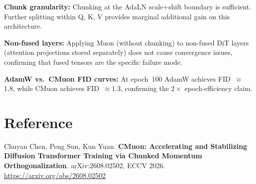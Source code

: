 \documentclass[10pt,twocolumn]{article}
\begin{document}
\textbf{Chunk granularity:} Chunking at the AdaLN scale+shift boundary is sufficient.
Further splitting within Q, K, V provides marginal additional gain on this architecture.

\textbf{Non-fused layers:} Applying Muon (without chunking) to non-fused DiT layers
(attention projections stored separately) does not cause convergence issues, confirming
that fused tensors are the specific failure mode.

\textbf{AdamW vs.\ CMuon FID curves:} At epoch~100 AdamW achieves FID~$\approx$1.8,
while CMuon achieves FID~$\approx$1.3, confirming the $2\times$ epoch-efficiency claim.

\section*{Reference}

Chuyan Chen, Peng Sun, Kun Yuan. \textbf{CMuon: Accelerating and Stabilizing
Diffusion Transformer Training via Chunked Momentum Orthogonalization}.
arXiv:2608.02502, ECCV 2026.
\url{https://arxiv.org/abs/2608.02502}
\end{document}
